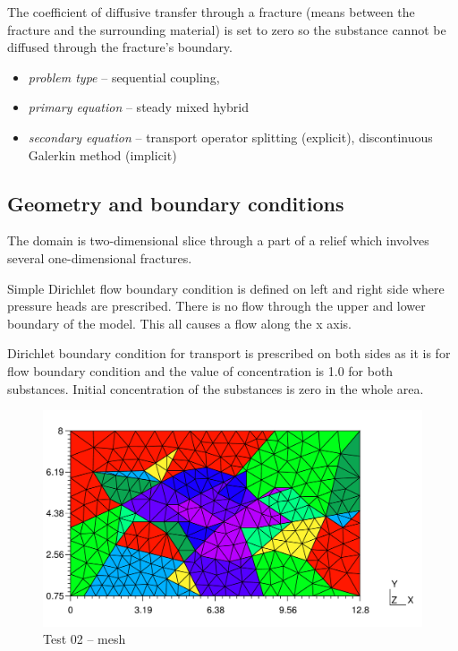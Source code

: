 The coefficient of diffusive transfer through a fracture (means between the fracture and the surrounding material) is set to zero so the substance cannot be diffused through the fracture's boundary.

  \begin{itemize} 
    \item \emph{problem type} -- sequential coupling, 
    \item \emph{primary equation} -- steady mixed hybrid
    \item \emph{secondary equation} -- transport operator splitting (explicit), discontinuous Galerkin method (implicit)
  \end{itemize}

\subsection*{Geometry and boundary conditions}
The domain is two-dimensional slice through a part of a relief which involves several one-dimensional fractures.

Simple Dirichlet flow boundary condition is defined on left and right side where pressure heads are prescribed. There is no flow through the upper and lower boundary of the model. This all causes a flow along the x axis.

Dirichlet boundary condition for transport is prescribed on both sides as it is for flow boundary condition and the value of concentration is 1.0 for both substances. Initial concentration of the substances is zero in the whole area. 
%
\begin{figure}[htb!]
\centering
\includegraphics[width=15cm]{tests_graphics/02_mesh.pdf}
\caption{Test 02 -- mesh}
\label{fig:test2_mesh}
\end{figure}
%
%
